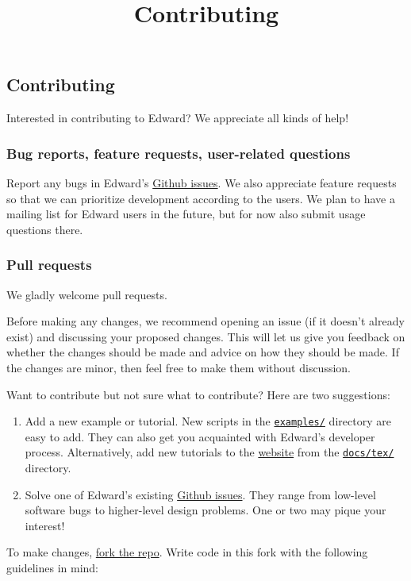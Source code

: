 \title{Contributing}

\subsection{Contributing}

Interested in contributing to Edward? We appreciate all kinds of help!

\subsubsection{Bug reports, feature requests, user-related questions}

Report any bugs in Edward's
\href{https://github.com/blei-lab/edward/issues}
{Github issues}.
We also appreciate feature requests so that we can prioritize
development according to the users.
We plan to have a
mailing list for Edward users in the future,
but for now also submit usage questions there.

\subsubsection{Pull requests}

We gladly welcome pull requests.

Before making any changes, we recommend opening an issue (if it
doesn't already exist) and discussing your proposed changes. This will
let us give you feedback on whether the changes should be made and
advice on how they should be made.
If the changes are minor, then feel free to make them
without discussion.

Want to contribute but not sure what to contribute? Here are two
suggestions:
\begin{enumerate}
\item
Add a new example or tutorial.
New scripts in the
\href{https://github.com/blei-lab/edward/tree/master/examples}
{\texttt{examples/}} directory are easy to add. They can also
get you acquainted with Edward's developer process.
Alternatively, add new tutorials to the
\href{tutorials}{website} from the
\href{https://github.com/blei-lab/edward/tree/master/docs/tex}
{\texttt{docs/tex/}} directory.
\item
Solve one of Edward's existing
\href{https://github.com/blei-lab/edward/issues}{Github issues}.
They range from low-level software bugs to higher-level design problems.
One or two may pique your interest!
\end{enumerate}

To make changes,
\href{https://help.github.com/articles/working-with-forks/}{fork the repo}.
Write code in this fork with the following guidelines in mind:

